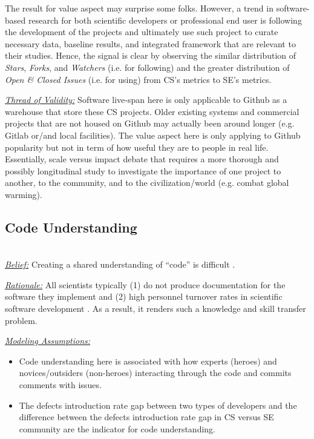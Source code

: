 \documentclass[sigconf,review,anonymous]{acmart}
\newcommand{\bi}{\begin{itemize}}
\newcommand{\ei}{\end{itemize}}
\begin{document}
The result for value aspect may surprise some folks. However, a trend in software-based research for both scientific developers or professional end user is following the development of the projects and ultimately use such project to curate necessary data, baseline results, and integrated framework that are relevant to their studies. Hence, the signal is clear by observing the similar distribution of \textit{Stars}, \textit{Forks}, and \textit{Watchers} (i.e. for following) and the greater distribution of \textit{Open \& Closed Issues} (i.e. for using) from CS's metrics to SE's metrics. 


\noindent \textit{\underline{Thread of Validity:}} Software live-span here is only applicable to Github as a warehouse that store these CS projects. Older existing systems and commercial projects that are not housed on Github may actually been around longer (e.g. Gitlab or/and local facilities). The value aspect here is only applying to Github popularity but not in term of how useful they are to people in real life. Essentially, scale versus impact debate that requires a more thorough and possibly longitudinal study to investigate the importance of one project to another, to the community, and to the civilization/world (e.g. combat global warming). 

\subsection{Code Understanding} ~\\
\noindent \textit{\underline{Belief:}} Creating a shared understanding of ``code'' is difficult \cite{segal07_problem, carver06_hpc, Shull05_parallel, sanders08_risk}. 

\noindent \textit{\underline{Rationale:}} All scientists typically (1) do not produce documentation for the software they implement \cite{segal07_enduser, sanders08_risk} and (2) high personnel turnover rates in scientific software development \cite{carver06_hpc, segal07_problem}. As a result, it renders such a knowledge and skill transfer problem. 

\noindent \textit{\underline{Modeling Assumptions:}} 

\bi
\item Code understanding here is associated with how experts (heroes) and novices/outsiders (non-heroes) interacting through the code and commits comments with issues. 
\item The defects introduction rate gap between two types of developers and the difference between the defects introduction rate gap in CS versus SE community are the indicator for code understanding.  
\ei
\end{document}
